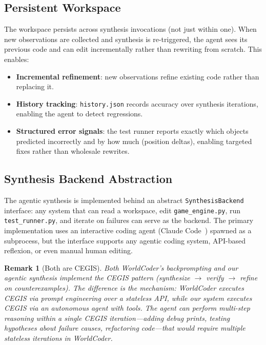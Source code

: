\documentclass{article}
\newtheorem{remark}{Remark}
\begin{document}
\subsection{Persistent Workspace}
\label{sec:workspace}

The workspace persists across synthesis invocations (not just within one).
When new observations are collected and synthesis is re-triggered, the agent
sees its previous code and can edit incrementally rather than rewriting from
scratch.  This enables:

\begin{itemize}[nosep]
    \item \textbf{Incremental refinement}: new observations refine existing
          code rather than replacing it.
    \item \textbf{History tracking}: \texttt{history.json} records accuracy
          over synthesis iterations, enabling the agent to detect regressions.
    \item \textbf{Structured error signals}: the test runner reports exactly
          which objects predicted incorrectly and by how much (position deltas),
          enabling targeted fixes rather than wholesale rewrites.
\end{itemize}

\subsection{Synthesis Backend Abstraction}
\label{sec:backend_abstraction}

The agentic synthesis is implemented behind an abstract
\texttt{SynthesisBackend} interface: any system that can read a workspace,
edit \texttt{game\_engine.py}, run \texttt{test\_runner.py}, and iterate on
failures can serve as the backend.  The primary implementation uses an
interactive coding agent (Claude Code~\cite{claudecode}) spawned as a
subprocess, but the interface supports any agentic coding system, API-based
reflexion, or even manual human editing.

\begin{remark}[Both are CEGIS]
Both WorldCoder's backprompting and our agentic synthesis implement the CEGIS
pattern (synthesize $\to$ verify $\to$ refine on counterexamples).  The
difference is the \emph{mechanism}: WorldCoder executes CEGIS via prompt
engineering over a stateless API, while our system executes CEGIS via an
autonomous agent with tools.  The agent can perform multi-step reasoning
within a single CEGIS iteration---adding debug prints, testing hypotheses
about failure causes, refactoring code---that would require multiple
stateless iterations in WorldCoder.
\end{remark}
\end{document}
